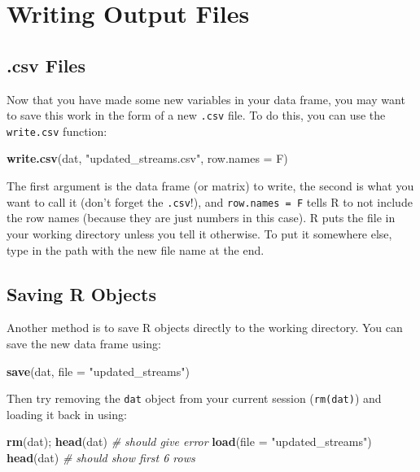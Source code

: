 \documentclass[]{book}
\newenvironment{Shaded}{\begin{snugshade}}{\end{snugshade}}
\newcommand{\KeywordTok}[1]{\textcolor[rgb]{0.13,0.29,0.53}{\textbf{#1}}}
\newcommand{\DataTypeTok}[1]{\textcolor[rgb]{0.13,0.29,0.53}{#1}}
\newcommand{\StringTok}[1]{\textcolor[rgb]{0.31,0.60,0.02}{#1}}
\newcommand{\CommentTok}[1]{\textcolor[rgb]{0.56,0.35,0.01}{\textit{#1}}}
\newcommand{\NormalTok}[1]{#1}
\theoremstyle{definition}
\theoremstyle{definition}
\theoremstyle{definition}
\theoremstyle{remark}
\begin{document}
\section{Writing Output Files}\label{writing-output-files}

\subsection{.csv Files}\label{csv-files}

Now that you have made some new variables in your data frame, you may
want to save this work in the form of a new \texttt{.csv} file. To do
this, you can use the \texttt{write.csv} function:

\begin{Shaded}
\begin{Highlighting}[]
\KeywordTok{write.csv}\NormalTok{(dat, }\StringTok{"updated_streams.csv"}\NormalTok{, }\DataTypeTok{row.names =}\NormalTok{ F)}
\end{Highlighting}
\end{Shaded}

The first argument is the data frame (or matrix) to write, the second is
what you want to call it (don't forget the \texttt{.csv}!), and
\texttt{row.names\ =\ F} tells R to not include the row names (because
they are just numbers in this case). R puts the file in your working
directory unless you tell it otherwise. To put it somewhere else, type
in the path with the new file name at the end.

\subsection{Saving R Objects}\label{saving-r-objects}

Another method is to save R objects directly to the working directory.
You can save the new data frame using:

\begin{Shaded}
\begin{Highlighting}[]
\KeywordTok{save}\NormalTok{(dat, }\DataTypeTok{file =} \StringTok{"updated_streams"}\NormalTok{)}
\end{Highlighting}
\end{Shaded}

Then try removing the \texttt{dat} object from your current session
(\texttt{rm(dat)}) and loading it back in using:

\begin{Shaded}
\begin{Highlighting}[]
\KeywordTok{rm}\NormalTok{(dat); }\KeywordTok{head}\NormalTok{(dat)  }\CommentTok{# should give error}
\KeywordTok{load}\NormalTok{(}\DataTypeTok{file =} \StringTok{"updated_streams"}\NormalTok{)}
\KeywordTok{head}\NormalTok{(dat) }\CommentTok{# should show first 6 rows}
\end{Highlighting}
\end{Shaded}
\end{document}
